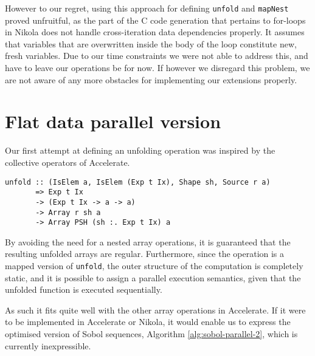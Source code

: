 
However to our regret, using this approach for defining \lstinline{unfold} and
\lstinline{mapNest} proved unfruitful, as the part of the C code generation that
pertains to for-loops in Nikola does not handle cross-iteration data
dependencies properly. It assumes that variables that are overwritten inside
the body of the loop constitute new, fresh variables. Due to our time
constraints we were not able to address this, and have to leave our operations
be for now. If however we disregard this problem, we are not aware of any more
obstacles for implementing our extensions properly.

\section{Flat data parallel version}
Our first attempt at defining an unfolding operation was inspired by the
collective operators of Accelerate.

\begin{lstlisting}
unfold :: (IsElem a, IsElem (Exp t Ix), Shape sh, Source r a)
       => Exp t Ix
       -> (Exp t Ix -> a -> a)
       -> Array r sh a
       -> Array PSH (sh :. Exp t Ix) a
\end{lstlisting}

By avoiding the need for a nested array operations, it is guaranteed
that the resulting unfolded arrays are regular. Furthermore, since the
operation is a mapped version of \lstinline{unfold}, the outer
structure of the computation is completely static, and it is possible
to assign a parallel execution semantics, given that the unfolded
function is executed sequentially.

As such it fits quite well with the other array operations in
Accelerate. If it were to be implemented in Accelerate or Nikola, it
would enable us to express the optimised version of Sobol sequences,
Algorithm \ref{alg:sobol-parallel-2}, which is currently
inexpressible. 

